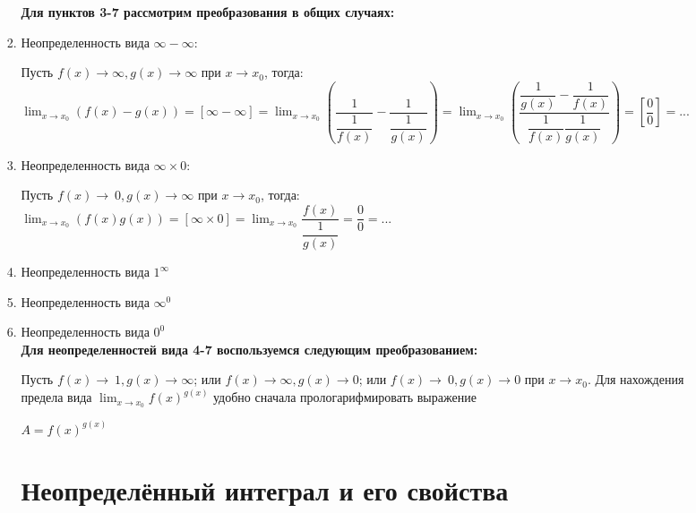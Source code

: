\documentclass[oneside]{book}
\begin{document}
\begin{enumerate}
\begin{itemize}
\begin{enumerate}
	\textbf{Для пунктов 3-7 рассмотрим преобразования в общих случаях:}

	\item Неопределенность вида $\infty-\infty$:

	 Пусть $f(x)\to\infty, g(x)\to\infty$ при $x\to x_{0}$, тогда:\\

	 $\lim_{x \to x_{0}} (f(x)-g(x))=
	 [\infty-\infty]=
	 \lim_{x \to x_{0}} (\dfrac{1}{\dfrac{1}{f(x)}}-\dfrac{1}{\dfrac{1}{g(x)}})=
	 \lim_{x \to x_{0}} (\dfrac{{\dfrac{1}{g(x)}}-{\dfrac{1}{f(x)}}}{{\dfrac{1}{f(x)}}{\dfrac{1}{g(x)}}})=
	 [\dfrac{0}{0}]=...$

	\item Неопределенность вида $\infty\times 0$:

	Пусть $f(x)\to\ 0, g(x)\to\infty$ при $x\to x_{0}$, тогда:\\

	$\lim_{x \to x_{0}} (f(x)g(x))=
	[\infty\times 0]=
	\lim_{x \to x_{0}} \dfrac{f(x)}{\dfrac{1}{g(x)}}=
	\dfrac{0}{0}=...$

	\item Неопределенность вида $1^{\infty}$
	\item Неопределенность вида $\infty^{0}$
	\item Неопределенность вида $0^{0}$\\

	\textbf{Для неопределенностей вида 4-7 воспользуемся следующим преобразованием:}

	Пусть $f(x)\to\ 1, g(x)\to\infty$; или $f(x)\to\infty, g(x)\to 0$; или $f(x)\to\ 0, g(x)\to 0$ при $x\to x_{0}$. Для нахождения предела вида $\lim_{x\to x_{0}} f(x)^{g(x)}$ удобно сначала прологарифмировать выражение
	 \begin{center}
		$A=f(x)^{g(x)}$
	\end{center}



\setcounter{chapter}{31}
\chapter[Неопределённый интеграл]{Неопределённый интеграл и его свойства}

\end{enumerate}
\end{itemize}
\end{enumerate}
\end{document}
